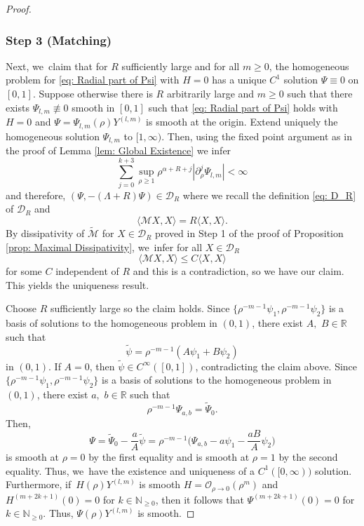 \documentclass[JEP,XML,SOM,Unicode]{cedram}
\theoremstyle{plain}
\theoremstyle{definition}
\begin{document}
\begin{proof}
\subsubsection*{Step 3 (Matching)}
Next, we~claim that for $R$ sufficiently large and for all $m\ge0$, the homogeneous problem for \eqref{eq: Radial part of Psi} with $H=0$ has a unique $C^1$ solution $\Psi\equiv0$ on $[0,1]$. Suppose otherwise \ie there is $R$ arbitrarily large and $m\ge0$ such that there exists $\Psi_{l,m}\not\equiv 0$ smooth in $[0,1]$ such that \eqref{eq: Radial part of Psi} holds with $H=0$ and $\Psi=\Psi_{l,m}(\rho)Y^{(l,m)}$ is smooth at the origin. Extend uniquely the homogeneous solution $\Psi_{l,m}$ to $[1,\infty)$. Then, using the fixed point argument as in the proof of Lemma \ref{lem: Global Existence} we infer
\[
\sum_{j=0}^{k+3}{}\sup_{\rho\ge1}\rho^{\alpha+R+j}|\partial_
\rho^j\Psi_{l,m}|<\infty
\]
and therefore, $(\Psi,-(\Lambda+R)\Psi)\in \mathcal D_R$ where we recall the definition \eqref{eq: D_R} of $\mathcal D_R$ and
\[
\langle \mathcal MX,X\rangle=R\langle X,X\rangle.
\]
By dissipativity of $\tilde{\mathcal M}$ for $X\in \mathcal D_R$ proved in Step 1 of the proof of Proposition \ref{prop: Maximal Dissipativity}, we~infer for all $X\in \mathcal D_R$
\[
\langle \mathcal M X,X\rangle\le C \langle X,X\rangle
\]
for some $C$ independent of $R$ and this is a contradiction, so we have our claim. This yields the uniqueness result.

Choose $R$ sufficiently large so the claim holds. Since $\{\rho^{-m-1}\psi_1,\rho^{-m-1}\psi_2\}$ is a basis of solutions to the homogeneous problem in $(0,1)$, there exist $A,$ $B\in\mathbb R$ such that
\[
\tilde\psi=\rho^{-m-1}(A\psi_1+B\psi_2)
\]
in $(0,1)$. If $A=0$, then $\tilde \psi\in C^\infty([0,1])$, contradicting the claim above. Since $\{\rho^{-m-1}\psi_1,\rho^{-m-1}\psi_2\}$ is a basis of solutions to the homogeneous problem in $(0,1)$, there exist $a,$ $b\in\mathbb R$ such that
\[
\rho^{-m-1}\Psi_{a,b}=\tilde \Psi_0.
\]
Then,
\[
\Psi=\tilde \Psi_0-\frac{a}{A}\tilde\psi=\rho^{-m-1} \Big(\Psi_{a,b}-a\psi_1-\frac{aB}{A}\psi_2 \Big)
\]
is smooth at $\rho=0$ by the first equality and is smooth at $\rho=1$ by the second equality. Thus, we~have the existence and uniqueness of a $C^1([0,\infty))$ solution. Furthermore, if~$H(\rho)Y^{(l,m)}$ is smooth \ie $H=\mathcal O_{\rho\to 0}(\rho^m)$ and $H^{(m+2k+1)}(0)=0$ for $k\in\mathbb N_{\ge 0}$, then it follows that $\Psi^{(m+2k+1)}(0)=0$ for $k\in\mathbb N_{\ge 0}$. Thus, $\Psi(\rho)Y^{(l,m)}$ is smooth.
\end{proof}
\end{document}
